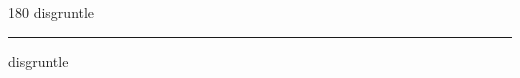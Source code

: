 
\begin{frame}
\begin{center}
\begin{turn}{180}
{\fontsize{2.5cm}{1em}\selectfont disgruntle}
\end{turn}
\vspace{1em}\par  
\hrule
\vspace{1em}\par  
{\fontsize{2.5cm}{1em}\selectfont disgruntle}
\end{center}
\end{frame}
